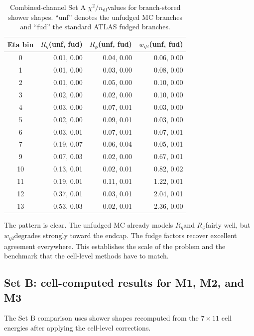 \documentclass[11pt,a4paper]{article}
\newcommand{\Reta}{\ensuremath{R_{\eta}}}
\newcommand{\Rphi}{\ensuremath{R_{\phi}}}
\newcommand{\weta}{\ensuremath{w_{\eta 2}}}
\newcommand{\chisq}{\ensuremath{\chi^2 / n_{\mathrm{df}}}}
\begin{document}
\begin{table}[H]
\centering
\caption{Combined-channel Set A \chisq values for branch-stored shower shapes. ``unf'' denotes the unfudged MC branches and ``fud'' the standard ATLAS fudged branches.}
\label{tab:setA-combined}
\begin{tabular}{crrr}
\toprule
Eta bin & \Reta (unf, fud) & \Rphi (unf, fud) & \weta (unf, fud) \\
\midrule
0  & 0.01, 0.00 & 0.04, 0.00 & 0.06, 0.00 \\
1  & 0.01, 0.00 & 0.03, 0.00 & 0.08, 0.00 \\
2  & 0.01, 0.00 & 0.05, 0.00 & 0.10, 0.00 \\
3  & 0.02, 0.00 & 0.02, 0.00 & 0.10, 0.00 \\
4  & 0.03, 0.00 & 0.07, 0.01 & 0.03, 0.00 \\
5  & 0.02, 0.00 & 0.09, 0.01 & 0.03, 0.00 \\
6  & 0.03, 0.01 & 0.07, 0.01 & 0.07, 0.01 \\
7  & 0.19, 0.07 & 0.06, 0.04 & 0.05, 0.01 \\
9  & 0.07, 0.03 & 0.02, 0.00 & 0.67, 0.01 \\
10 & 0.13, 0.01 & 0.02, 0.01 & 0.82, 0.02 \\
11 & 0.19, 0.01 & 0.11, 0.01 & 1.22, 0.01 \\
12 & 0.37, 0.01 & 0.03, 0.01 & 2.04, 0.01 \\
13 & 0.53, 0.03 & 0.02, 0.01 & 2.36, 0.00 \\
\bottomrule
\end{tabular}
\end{table}

The pattern is clear. The unfudged MC already models \Reta and \Rphi fairly
well, but \weta degrades strongly toward the endcap. The fudge factors recover
excellent agreement everywhere. This establishes the scale of the problem and
the benchmark that the cell-level methods have to match.

\subsection{Set B: cell-computed results for M1, M2, and M3}

The Set B comparison uses shower shapes recomputed from the $7 \times 11$ cell
energies after applying the cell-level corrections.
\end{document}
